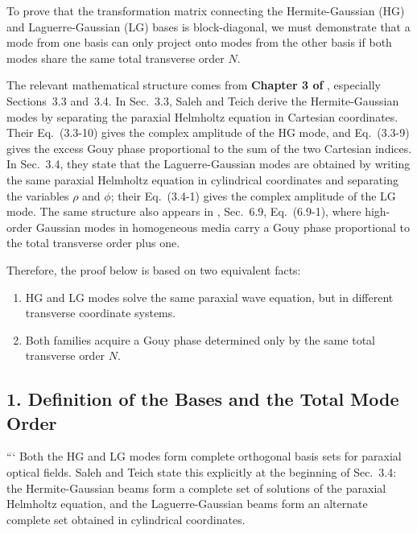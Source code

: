 \begin{resolucao}[Solution]

To prove that the transformation matrix connecting the Hermite-Gaussian (HG) and Laguerre-Gaussian (LG) bases is block-diagonal, we must demonstrate that a mode from one basis can only project onto modes from the other basis if both modes share the same total transverse order $N$.

The relevant mathematical structure comes from \textbf{Chapter 3 of }, especially Sections~3.3 and~3.4. In Sec.~3.3, Saleh and Teich derive the Hermite-Gaussian modes by separating the paraxial Helmholtz equation in Cartesian coordinates. Their Eq.~(3.3-10) gives the complex amplitude of the HG mode, and Eq.~(3.3-9) gives the excess Gouy phase proportional to the sum of the two Cartesian indices. In Sec.~3.4, they state that the Laguerre-Gaussian modes are obtained by writing the same paraxial Helmholtz equation in cylindrical coordinates and separating the variables $\rho$ and $\phi$; their Eq.~(3.4-1) gives the complex amplitude of the LG mode. The same structure also appears in \textbf{}, Sec.~6.9, Eq.~(6.9-1), where high-order Gaussian modes in homogeneous media carry a Gouy phase proportional to the total transverse order plus one.

Therefore, the proof below is based on two equivalent facts:
\begin{enumerate}
\item HG and LG modes solve the same paraxial wave equation, but in different transverse coordinate systems.
\item Both families acquire a Gouy phase determined only by the same total transverse order $N$.
\end{enumerate}

\subsection*{1. Definition of the Bases and the Total Mode Order}

```
Both the HG and LG modes form complete orthogonal basis sets for paraxial optical fields. Saleh and Teich state this explicitly at the beginning of Sec.~3.4: the Hermite-Gaussian beams form a complete set of solutions of the paraxial Helmholtz equation, and the Laguerre-Gaussian beams form an alternate complete set obtained in cylindrical coordinates.


\end{resolucao}
